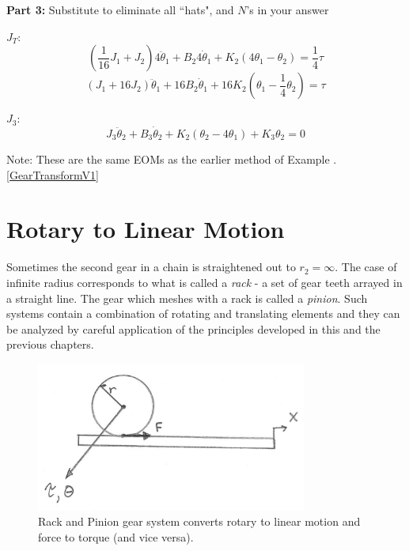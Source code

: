 \begin{Example}
\noindent
{\bf Part 3:}
Substitute to eliminate all ``hats", and $N$'s in your answer





\noindent $J_T$:
\[
\left(\frac{1}{16} J_1 + J_2\right)  4 \ddot{\theta}_1 + B_2  4 \dot{\theta}_1 + K_2\left(4 \theta_1 - \theta_2\right) = \frac{1}{4} \tau
\]
\[
\left(  J_1 + 16J_2\right)\ddot{\theta}_1 + 16 B_2  \dot{\theta}_1 + 16 K_2\left( \theta_1 - \frac14 \theta_2\right) =  \tau
\]
%


\noindent $J_3$:
\[
J_3 \ddot{\theta}_2 + B_3 \dot{\theta}_2 + K_2(\theta_2 - 4\theta_1) + K_3 \theta_2 = 0
\]

Note: These are the same EOMs as the earlier method of Example \thechapter.\ref{GearTransformV1}

\end{Example}


\section{Rotary to Linear Motion}


Sometimes the second gear in a chain is straightened out to $r_2 = \infty$.  The case of infinite radius corresponds to what is called a {\it rack} - a set of gear teeth arrayed in a straight line.  The gear which meshes with a rack is called a {\it pinion}.
Such systems contain a combination of rotating and translating elements and they can be analyzed by careful application of the principles developed in this and the previous chapters.

\begin{figure}\centering
\includegraphics[width=3.5in]{figs03/00755a.png}
\caption{Rack and Pinion gear system converts rotary to linear motion and force to torque (and vice versa).}\label{basicrotarylinear}
\end{figure}


